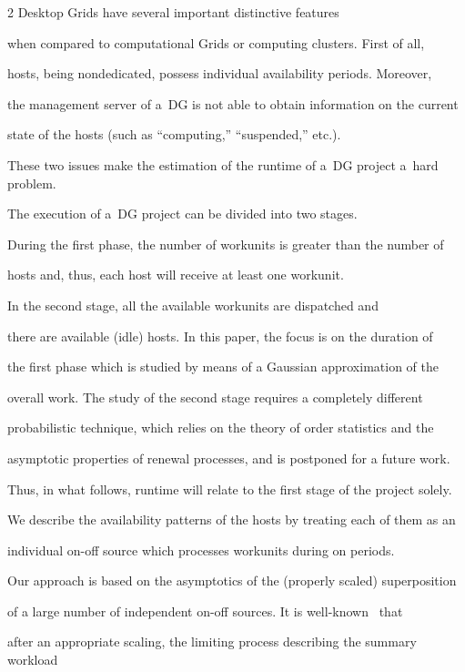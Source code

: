 \begin{multicols}{2}
Desktop Grids have several important distinctive  features 

when compared to computational Grids or computing clusters. First of all, 

hosts, being nondedicated, possess individual availability periods. Moreover, 

the management server of a~DG is not able to obtain information on the current 

state of the hosts (such as ``computing,'' ``suspended,'' etc.). 

These two issues  make the estimation of the runtime of a~DG project a~hard problem. 



The execution of a~DG project can be divided into two stages. 

During the first phase, the number of work\-units is greater than the number of 

hosts and, thus,  each host will receive at least one workunit. 

In the second stage, all the available workunits are dispatched and

 there are available (idle) hosts. In this paper, the focus is on the duration of  

 the first phase  which is studied by means of a Gaussian approximation of the 

 overall work.  The   study of the second stage requires a completely different 

 probabilistic technique, which relies on  the theory of order statistics and the 

 asymptotic properties of renewal processes, and is postponed for a future work.

Thus, in what follows, runtime will relate to the first stage of the project solely.





We describe the availability patterns of the hosts by treating each of them as an 

individual on-off source which processes workunits during on periods.  

Our approach  is based on the asymptotics of the (properly scaled) superposition 

of a large number of independent on-off sources. It is well-known~\cite{4-luk-1} that 

after an appropriate scaling, the limiting process describing the summary workload 


\end{multicols}
